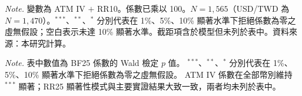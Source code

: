 \begin{table}[htbp]
    \vspace{3mm}
 
    \begin{minipage}{\textwidth}
        \fontsize{9pt}{13pt}\selectfont
        \textit{Note.} 變數為 ATM IV $+$ RR10。係數已乘以 100。$N = 1{,}565$（USD/TWD 為 $N = 1{,}470$）。$^{***}$、$^{**}$、$^{*}$ 分別代表在 1\%、5\%、10\% 顯著水準下拒絕係數為零之虛無假設；空白表示未達 10\% 顯著水準。截距項含於模型但未列於表中。資料來源：本研究計算。
    \end{minipage}
\end{table}

\begin{table}[htbp]
    \centering
    \linespread{1.2}\selectfont
    \renewcommand{\arraystretch}{1.2}
    \fontsize{8pt}{11pt}\selectfont
    \vspace{3mm}
    \caption{新增蝶式價差的迴歸係數 Wald 檢定結果}
    \label{tab:bf25_coef}
    
    \vspace{3mm}
    
    \begin{minipage}{\textwidth}
        \fontsize{9pt}{13pt}\selectfont
        \textit{Note.} 表中數值為 BF25 係數的 Wald 檢定 $p$ 值。
        $^{***}$、$^{**}$、$^{*}$ 分別代表在 1\%、5\%、10\% 顯著水準下拒絕係數為零之虛無假設。
        ATM IV 係數在全部幣別維持 $^{***}$ 顯著；RR25 顯著性模式與主要實證結果大致一致，兩者均未列於表中。
    \end{minipage}
\end{table}

